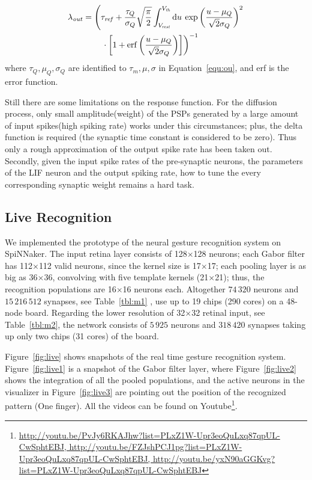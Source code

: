 \documentclass[journal]{journal}
\def\D{\mathrm{d}}
\begin{document}
\begin{align}
\lambda_\mathit{out} &=\left(\tau_\mathit{ref} + \frac{\tau_Q}{\sigma_Q}\sqrt{\frac{\pi}{2}} \int_{V_\mathit{rest}}^{V_\mathit{th}}\D u \:\exp \left(\frac{u-\mu_Q}{\sqrt2\sigma_Q} \right )^{2} \right. \nonumber \\
&\qquad \left. \vphantom{\int_t} \cdot  \left[1+\mathrm{erf} \left(\frac{u-\mu_Q}{\sqrt2\sigma_Q} \right ) \right ]\right)^{-1}
\label{equ:sgt}
\end{align}
where $\tau_Q, \mu_Q, \sigma_Q$ are identified to $\tau_m, \mu, \sigma$ in Equation~\ref{equ:ou}, and erf is the error function.

Still there are some limitations on the response function. 
For the diffusion process, only small amplitude(weight) of the PSPs generated by a large amount of input spikes(high spiking rate) works under this circumstances; 
plus, the delta function is required (the synaptic time constant is considered to be zero). Thus only a rough approximation of the output spike rate has been taken out.
Secondly, given the input spike rates of the pre-synaptic neurons, the parameters of the LIF neuron and the output spiking rate, how to tune the every corresponding synaptic weight remains a hard task.


\subsection{Live Recognition}
We implemented the prototype of the neural gesture recognition system on SpiNNaker. 
The input retina layer consists of 128$\times$128 neurons; 
each Gabor filter has 112$\times$112 valid neurons, since the kernel size is 17$\times$17; 
each pooling layer is as big as 36$\times$36, convolving with five template kernels (21$\times$21); 
thus, the recognition populations are 16$\times$16 neurons each. Altogether $74\,320$ neurons and $15\,216\,512$ synapses, see Table~\ref{tbl:m1} , use up to 19 chips (290 cores) on a 48-node board. Regarding the lower resolution of 32$\times$32 retinal input, see Table~\ref{tbl:m2}, the network consists of $5\,925$ neurons and $318\,420$ synapses taking up only two chips (31 cores) of the board.

Figure~\ref{fig:live} shows snapshots of the real time gesture recognition system. 
Figure~\ref{fig:live1} is a snapshot of the Gabor filter layer, where Figure~\ref{fig:live2} shows the integration of all the pooled populations, and the active neurons in the visualizer in Figure~\ref{fig:live3} are pointing out the position of the recognized pattern (One finger). 
All the videos can be found on Youtube\footnote{\url{
http://youtu.be/PvJy6RKAJhw?list=PLxZ1W-Upr3eoQuLxq87qpUL-CwSphtEBJ, http://youtu.be/FZJshPCJ1pg?list=PLxZ1W-Upr3eoQuLxq87qpUL-CwSphtEBJ, http://youtu.be/yxN90aGGKvg?list=PLxZ1W-Upr3eoQuLxq87qpUL-CwSphtEBJ}}.
\end{document}
